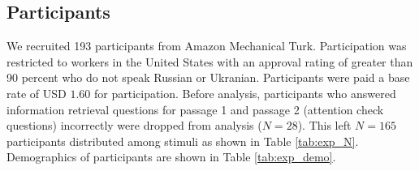 

\begin{table}[]
\caption{N for each condition. }
\label{tab:exp_N}
\end{table}

\subsection{Participants} 

We recruited 193 participants from Amazon Mechanical Turk. Participation was restricted to
workers in the United States with an approval rating of greater than 90 percent who do not speak Russian or Ukranian. Participants were paid a base rate of USD $1.60$ for participation. Before analysis, participants who answered information retrieval questions for passage 1 and passage 2 (attention check questions) incorrectly were dropped from analysis ($N = 28$).  This left $N = 165$ participants distributed among stimuli as shown in Table \ref{tab:exp_N}. Demographics of participants are shown in Table \ref{tab:exp_demo}.


